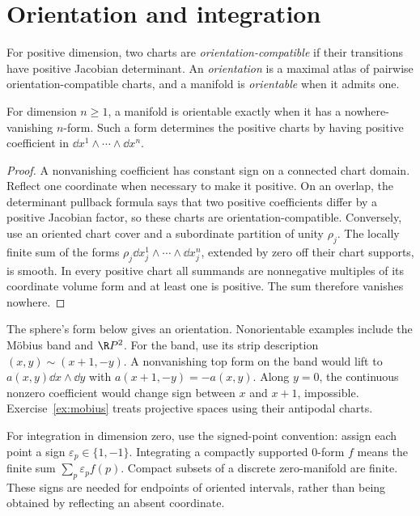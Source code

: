 \section{Orientation and integration}

\begin{definition}
For positive dimension, two charts are \emph{orientation-compatible} if their transitions have positive Jacobian determinant. An \emph{orientation} is a maximal atlas of pairwise orientation-compatible charts, and a manifold is \emph{orientable} when it admits one.
\end{definition}

\begin{proposition}\label{prop:volumeform}
For dimension $n\ge1$, a manifold is orientable exactly when it has a nowhere-vanishing $n$-form. Such a form determines the positive charts by having positive coefficient in $\dd x^1\wedge\cdots\wedge\dd x^n$.
\end{proposition}

\begin{proof}
A nonvanishing coefficient has constant sign on a connected chart domain. Reflect one coordinate when necessary to make it positive. On an overlap, the determinant pullback formula says that two positive coefficients differ by a positive Jacobian factor, so these charts are orientation-compatible. Conversely, use an oriented chart cover and a subordinate partition of unity $\rho_j$. The locally finite sum of the forms $\rho_j\dd x_j^1\wedge\cdots\wedge\dd x_j^n$, extended by zero off their chart supports, is smooth. In every positive chart all summands are nonnegative multiples of its coordinate volume form and at least one is positive. The sum therefore vanishes nowhere.
\end{proof}

The sphere's form below gives an orientation. Nonorientable examples include the M\"obius band and $\R P^2$. For the band, use its strip description $(x,y)\sim(x+1,-y)$. A nonvanishing top form on the band would lift to $a(x,y)\dd x\wedge\dd y$ with $a(x+1,-y)=-a(x,y)$. Along $y=0$, the continuous nonzero coefficient would change sign between $x$ and $x+1$, impossible. Exercise~\ref{ex:mobius} treats projective spaces using their antipodal charts.

For integration in dimension zero, use the signed-point convention: assign each point a sign $\varepsilon_p\in\{1,-1\}$. Integrating a compactly supported $0$-form $f$ means the finite sum $\sum_p\varepsilon_pf(p)$. Compact subsets of a discrete zero-manifold are finite. These signs are needed for endpoints of oriented intervals, rather than being obtained by reflecting an absent coordinate.

